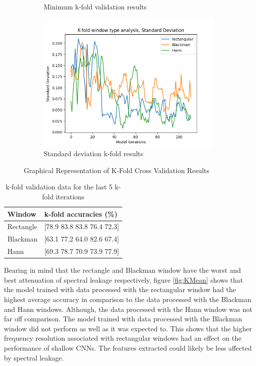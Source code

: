 \documentclass[class=report,11pt,crop=false]{standalone}
\begin{document}
\begin{figure}[hbt!]
\begin{subfigure}[b]{0.5\textwidth}
        \caption{Minimum k-fold validation results}
        \label{fig:KMin}
    \end{subfigure}
    \hfill
    \begin{subfigure}[b]{0.5\textwidth}
        \includegraphics[width=\linewidth]{Images/kfoldStandard Deviation.png}
        \caption{Standard deviation k-fold results}
        \label{fig:KStd}
    \end{subfigure}
    \caption{Graphical Representation of K-Fold Cross Validation Results}
    \label{fig:K-Fold}
\end{figure}

\begin{table}[h]
\centering
\begin{tabular}{|l|l|}
\hline
\textbf{Window} & \textbf{k-fold accuracies (\%)} \\
\hline
Rectangle & [78.9 83.8 83.8 76.4 72.3] \\
Blackman & [63.1 77.2 64.0 82.6 67.4] \\
Hann & [69.3 78.7 70.9 73.9 77.9] \\
\hline
\end{tabular}
\caption{k-fold validation data for the last 5 k-fold iterations}
\label{tab:k-fold-average}
\end{table}

Bearing in mind that the rectangle and Blackman window have the worst and best attenuation of spectral leakage respectively, figure \ref{fig:KMean} shows that the model trained with data processed with the rectangular window had the highest average accuracy in comparison to the data processed with the Blackman and Hann windows. Although, the data processed with the Hann window was not far off comparison. The model trained with data processed with the Blackman window did not perform as well as it was expected to. This shows that the higher frequency resolution associated with rectangular windows had an effect on the performance of shallow CNNs. The features extracted could likely be less affected by spectral leakage.
\end{document}
